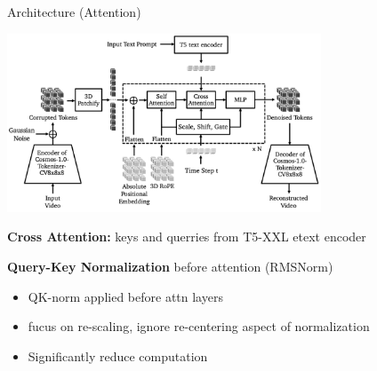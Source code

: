 \documentclass{beamer}
\begin{document}
\begin{frame}[t]{Architecture (Attention)}
    \vspace{-1.6em}
    \begin{center}
        \includegraphics[width=0.7\textwidth]{./img/diffusion_arch.png}
    \end{center}
    \textbf{Cross Attention:} keys and querries from T5-XXL etext encoder\newline

    \textbf{Query-Key Normalization} before attention (RMSNorm) 
    \begin{itemize}[label=-]
        \item  QK-norm applied before attn layers
        \item  fucus on re-scaling, ignore re-centering aspect of normalization
        \item Significantly reduce computation
   \end{itemize}
\end{frame}
\end{document}
